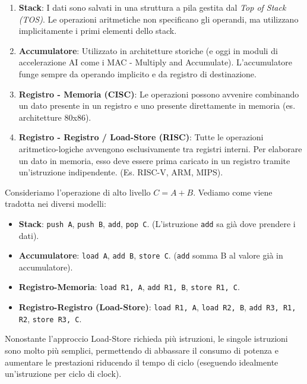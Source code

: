 \begin{enumerate}
    \item \textbf{Stack}: I dati sono salvati in una struttura a pila gestita dal \textit{Top of Stack (TOS)}. Le operazioni aritmetiche non specificano gli operandi, ma utilizzano implicitamente i primi elementi dello stack.
    \item \textbf{Accumulatore}: Utilizzato in architetture storiche (e oggi in moduli di accelerazione AI come i MAC - Multiply and Accumulate). L'accumulatore funge sempre da operando implicito e da registro di destinazione.
    \item \textbf{Registro - Memoria (CISC)}: Le operazioni possono avvenire combinando un dato presente in un registro e uno presente direttamente in memoria (es. architetture 80x86).
    \item \textbf{Registro - Registro / Load-Store (RISC)}: Tutte le operazioni aritmetico-logiche avvengono esclusivamente tra registri interni. Per elaborare un dato in memoria, esso deve essere prima caricato in un registro tramite un'istruzione indipendente. (Es. RISC-V, ARM, MIPS).
\end{enumerate}

\begin{example}
Consideriamo l'operazione di alto livello \( C = A + B \). Vediamo come viene tradotta nei diversi modelli:
\begin{itemize}
    \item \textbf{Stack}: \texttt{push A}, \texttt{push B}, \texttt{add}, \texttt{pop C}. (L'istruzione \texttt{add} sa già dove prendere i dati).
    \item \textbf{Accumulatore}: \texttt{load A}, \texttt{add B}, \texttt{store C}. (\texttt{add} somma B al valore già in accumulatore).
    \item \textbf{Registro-Memoria}: \texttt{load R1, A}, \texttt{add R1, B}, \texttt{store R1, C}.
    \item \textbf{Registro-Registro (Load-Store)}: \texttt{load R1, A}, \texttt{load R2, B}, \texttt{add R3, R1, R2}, \texttt{store R3, C}. 
\end{itemize}
Nonostante l'approccio Load-Store richieda più istruzioni, le singole istruzioni sono molto più semplici, permettendo di abbassare il consumo di potenza e aumentare le prestazioni riducendo il tempo di ciclo (eseguendo idealmente un'istruzione per ciclo di clock).
\end{example}

